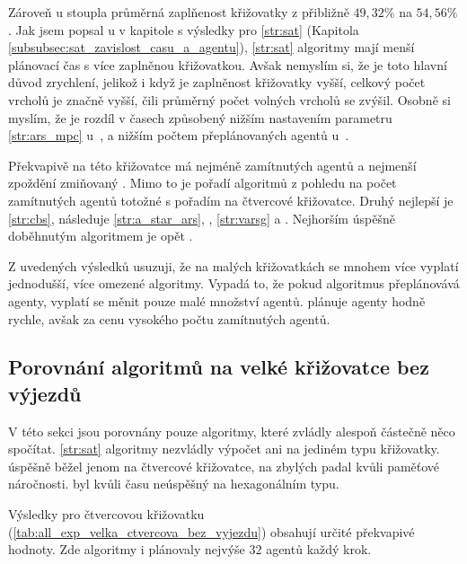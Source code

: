 Zároveň u  stoupla průměrná zaplňenost křižovatky z přibližně $49,32\%$ na $54,56\%$.
Jak jsem popsal u v kapitole s výsledky pro \ref{str:sat} (Kapitola \ref{subsubsec:sat_zavislost_casu_a_agentu}),
\ref{str:sat} algoritmy mají menší plánovací čas s více zaplněnou křižovatkou.
Avšak nemyslím si, že je toto hlavní důvod zrychlení, jelikož i když je zaplněnost křižovatky vyšší,
celkový počet vrcholů je značně vyšší, čili průměrný počet volných vrcholů se zvýšil.
Osobně si myslím, že je rozdíl v časech způsobený nižším nastavením parametru \ref{str:ars_mpc}
u~, a nižším počtem přeplánovaných agentů u~.

Překvapivě na této křižovatce má nejméně zamítnutých agentů a nejmenší zpoždění zmiňovaný .
Mimo to je pořadí algoritmů z pohledu na počet zamítnutých agentů totožné s pořadím na čtvercové křižovatce.
Druhý nejlepší je \ref{str:cbs}, následuje \ref{str:a_star_ars}, , \ref{str:varsg}
a .
Nejhorším úspěšně doběhnutým algoritmem je opět .



Z uvedených výsledků usuzuji, že na malých křižovatkách se mnohem více vyplatí jednodušší, více omezené algoritmy.
Vypadá to, že pokud algoritmus přeplánovává agenty, vyplatí se měnit pouze malé množství agentů.
 plánuje agenty hodně rychle, avšak za cenu vysokého počtu zamítnutých agentů.

\subsection{Porovnání algoritmů na velké křižovatce bez výjezdů}
\label{subsec:porovnani_algoritmu_na_velke_krizovatce_bez_vyjezdu}

V této sekci jsou porovnány pouze algoritmy, které zvládly alespoň částečně něco spočítat.
\ref{str:sat} algoritmy nezvládly výpočet ani na jediném typu křižovatky.
 úspěšně běžel jenom na čtvercové křižovatce, na zbylých padal kvůli paměťové náročnosti.
 byl kvůli času neúspěšný na hexagonálním typu.

Výsledky pro čtvercovou křižovatku (\ref{tab:all_exp_velka_ctvercova_bez_vyjezdu}) obsahují určité překvapivé hodnoty.
Zde algoritmy  i  plánovaly nejvýše $32$ agentů každý krok.

